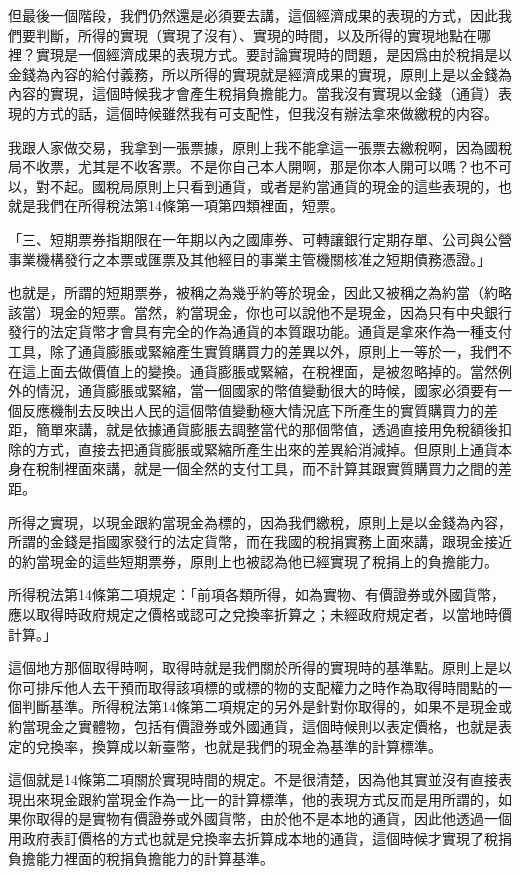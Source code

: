 \documentclass[oneside,sub3section]{ctexbook}
\begin{document}
但最後一個階段，我們仍然還是必須要去講，這個經濟成果的表現的方式，因此我們要判斷，所得的實現（實現了沒有）、實現的時間，以及所得的實現地點在哪裡？實現是一個經濟成果的表現方式。要討論實現時的問題，是因爲由於稅捐是以金錢為內容的給付義務，所以所得的實現就是經濟成果的實現，原則上是以金錢為內容的實現，這個時候我才會產生稅捐負擔能力。當我沒有實現以金錢（通貨）表現的方式的話，這個時候雖然我有可支配性，但我沒有辦法拿來做繳稅的内容。

我跟人家做交易，我拿到一張票據，原則上我不能拿這一張票去繳稅啊，因為國稅局不收票，尤其是不收客票。不是你自己本人開啊，那是你本人開可以嗎？也不可以，對不起。國稅局原則上只看到通貨，或者是約當通貨的現金的這些表現的，也就是我們在所得稅法第14條第一項第四類裡面，短票。

「三、短期票券指期限在一年期以內之國庫券、可轉讓銀行定期存單、公司與公營事業機構發行之本票或匯票及其他經目的事業主管機關核准之短期債務憑證。」

也就是，所謂的短期票券，被稱之為幾乎約等於現金，因此又被稱之為約當（約略該當）現金的短票。當然，約當現金，你也可以說他不是現金，因為只有中央銀行發行的法定貨幣才會具有完全的作為通貨的本質跟功能。通貨是拿來作為一種支付工具，除了通貨膨脹或緊縮產生實質購買力的差異以外，原則上一等於一，我們不在這上面去做價值上的變換。通貨膨脹或緊縮，在稅裡面，是被忽略掉的。當然例外的情況，通貨膨脹或緊縮，當一個國家的幣值變動很大的時候，國家必須要有一個反應機制去反映出人民的這個幣值變動極大情況底下所產生的實質購買力的差距，簡單來講，就是依據通貨膨脹去調整當代的那個幣值，透過直接用免稅額後扣除的方式，直接去把通貨膨脹或緊縮所產生出來的差異給消減掉。但原則上通貨本身在稅制裡面來講，就是一個全然的支付工具，而不計算其跟實質購買力之間的差距。

所得之實現，以現金跟約當現金為標的，因為我們繳稅，原則上是以金錢為內容，所謂的金錢是指國家發行的法定貨幣，而在我國的稅捐實務上面來講，跟現金接近的約當現金的這些短期票券，原則上也被認為他已經實現了稅捐上的負擔能力。

所得稅法第14條第二項規定：「前項各類所得，如為實物、有價證券或外國貨幣，應以取得時政府規定之價格或認可之兌換率折算之；未經政府規定者，以當地時價計算。」

這個地方那個取得時啊，取得時就是我們關於所得的實現時的基準點。原則上是以你可排斥他人去干預而取得該項標的或標的物的支配權力之時作為取得時間點的一個判斷基準。所得稅法第14條第二項規定的另外是針對你取得的，如果不是現金或約當現金之實體物，包括有價證券或外國通貨，這個時候則以表定價格，也就是表定的兌換率，換算成以新臺幣，也就是我們的現金為基準的計算標準。

這個就是14條第二項關於實現時間的規定。不是很清楚，因為他其實並沒有直接表現出來現金跟約當現金作為一比一的計算標準，他的表現方式反而是用所謂的，如果你取得的是實物有價證券或外國貨幣，由於他不是本地的通貨，因此他透過一個用政府表訂價格的方式也就是兌換率去折算成本地的通貨，這個時候才實現了稅捐負擔能力裡面的稅捐負擔能力的計算基準。
\end{document}
